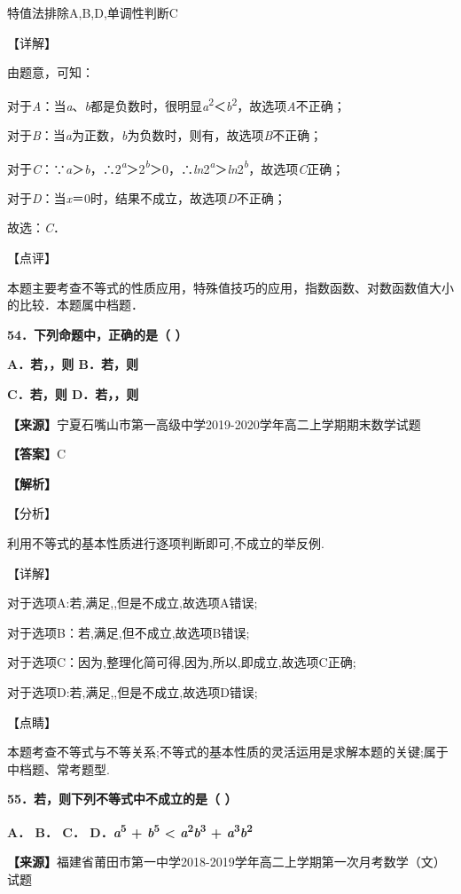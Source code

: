 \documentclass[
]{article}
\begin{document}
特值法排除A,B,D,单调性判断C

【详解】

由题意，可知：

对于\emph{A}：当\emph{a}、\emph{b}都是负数时，很明显\emph{a}\textsuperscript{2}＜\emph{b}\textsuperscript{2}，故选项\emph{A}不正确；

对于\emph{B}：当\emph{a}为正数，\emph{b}为负数时，则有，故选项\emph{B}不正确；

对于\emph{C}：∵\emph{a}＞\emph{b}，∴2\emph{\textsuperscript{a}}＞2\emph{\textsuperscript{b}}＞0，∴\emph{ln}2\emph{\textsuperscript{a}}＞\emph{ln}2\emph{\textsuperscript{b}}，故选项\emph{C}正确；

对于\emph{D}：当\emph{x}＝0时，结果不成立，故选项\emph{D}不正确；

故选：\emph{C}．

【点评】

本题主要考查不等式的性质应用，特殊值技巧的应用，指数函数、对数函数值大小的比较．本题属中档题．

\textbf{54．下列命题中，正确的是（ ）}

\textbf{A．若，，则 B．若，则}

\textbf{C．若，则 D．若，，则}

\textbf{【来源】}宁夏石嘴山市第一高级中学2019-2020学年高二上学期期末数学试题

\textbf{【答案】}C

\textbf{【解析】}

【分析】

利用不等式的基本性质进行逐项判断即可,不成立的举反例.

【详解】

对于选项A:若,满足,,但是不成立,故选项A错误;

对于选项B：若,满足,但不成立,故选项B错误;

对于选项C：因为,整理化简可得,因为,所以,即成立,故选项C正确;

对于选项D:若,满足,,但是不成立,故选项D错误;

【点睛】

本题考查不等式与不等关系;不等式的基本性质的灵活运用是求解本题的关键;属于中档题、常考题型.

\textbf{55．若，则下列不等式中不成立的是（ ）}

\textbf{A． B． C． D．\emph{a}\textsuperscript{5} +
\emph{b}\textsuperscript{5} \textless{}
\emph{a}\textsuperscript{2}\emph{b}\textsuperscript{3} +
\emph{a}\textsuperscript{3}\emph{b}\textsuperscript{2}}

\textbf{【来源】}福建省莆田市第一中学2018-2019学年高二上学期第一次月考数学（文）试题
\end{document}
